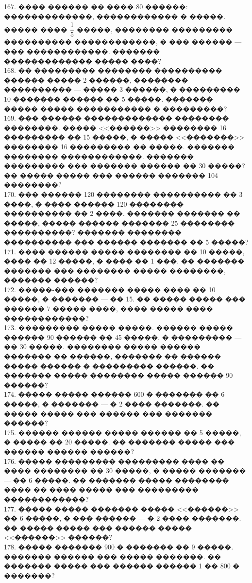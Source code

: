 \documentclass[12pt]{article}
\begin{document}
167. ���� ������ �� ���� 80 ������: �������������, ������������ � �����. ����� ���� $\cfrac{1}{5}$ �����, �������� ��������� ���������� ������������, � ��� ������ --- ��� ������������. ������� ������������� ����� ����?\\
168. �� ��������� �������� ���������� ������ ����� 2 ������, �������� ���������� --- ����� 3 ������, � ��������� 10 ������� ������ �� 5 �����. ������� ����� ����� ����������� � ���������?\\
169. ��� ������ ������������� �������� ��������. ����� <<������>> �������� 16 ��������� �� 15 �����, � ����� <<�������>> �������� 16 ��������� �� �����. ������� �������� ������������. ������� ��������� ��� ������� ������ �� 30 �����? �� ����� ����� ��� ������ ������� 104 ��������?\\
170. ��� ������ 120 �������� ���������� �� 3 ����, � ���� ������ 120 �������� ���������� �� 2 ����. ������� ������� �� �����, ����� ������ ������� 25 �������� ����������? ������� �������� ���������� ��� ������ ������� �� 5 �����?\\
171. ���� ������ ����� �������� �� 10 �����, ���� �� 12 �����, � ���� �� 1 ���. �� ������� ������� ��� �������� ����� ��������, ������� ������?\\
172. �����-��� ������� ����� ���� �� 10 �����, � ������� --- �� 15. �� ����� ����� ��� ������ 7 ����� ����, ���� ����� ���� ������������?\\
173. ��������� ����� �����. ������ ����� ������ 90 ������ �� 45 �����, � ��������� --- �� 30 �����. �������� ����� ������ ������� �� ������, ������� �� ������ ����� ������ � ��������� ������. �� ������� ����� �������� ����� ������ 90 ������?\\
174. ����� ����� ������ 600 � ������� �� 6 �����, � ������� --- � 2 ���� �������. �� ����� ����� ��� ������ ��� ������� ������?\\
175. ������ ������ ����� ������ �� 5 �����, � ����� �� 20 �����. �� ������� ����� ��� ������ ������ ������?\\
176. ����� ��������� ��������� ���� �� ���� �������� �� 30 �����, � ����� ������� --- �� 6 �����. �� ������� ����� �������� ���� �� ���� ����� ��� ��������� ������������?\\
177. ����� ����� ������� ����� <<������>> �� 6 �����, � ��� ������ --- � 2 ���� �������. �� ����� ����� ��� ������ ����� <<������>> ������?\\
178. ����� ������� 900 � ������� �� 9 �����. ������� ������ ��� ����� �������. �� ������� ����� ��� ������ ������  1 �� 800 � �������?\\
\end{document}
